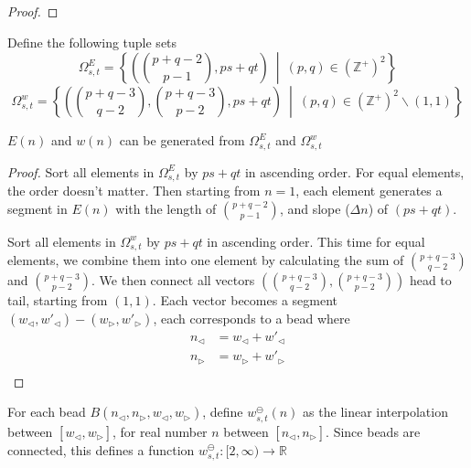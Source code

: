 \documentclass[]{article}
\begin{document}
\begin{proof}
\end{proof}

\vspace{1cm}
\begin{definition}[Pascal]
	Define the following tuple sets
	\[
	\Omega^E_{s,t} = \left\{\left(\binom{p+q-2}{p-1}, ps+qt \right) \ \middle|\ (p,q)\in(\mathbb{Z}^+)^2 \right\}
	\]
	\[
	\Omega^w_{s,t} = \left\{\left(\binom{p+q-3}{q-2}, \binom{p+q-3}{p-2}, ps+qt \right) \ \middle|\ (p,q)\in(\mathbb{Z}^+)^2 \backslash (1,1) \right\}
	\]
\end{definition}

\vspace{1cm}
\begin{lemma}[Pascal]
	$E(n)$ and $w(n)$ can be generated from $\Omega^E_{s,t}$ and $\Omega^w_{s,t}$
\end{lemma}
\begin{proof}

Sort all elements in $\Omega^E_{s,t}$ by $ps+qt$ in ascending order. For equal elements, the order doesn't matter. Then starting from $n=1$, each element generates a segment in $E(n)$ with the length of $\binom{p+q-2}{p-1}$, and slope ($\Delta n$) of $(ps+qt)$.


Sort all elements in $\Omega^w_{s,t}$ by $ps+qt$ in ascending order. This time for equal elements, we combine them into one element by calculating the sum of $\binom{p+q-3}{q-2}$ and $\binom{p+q-3}{p-2}$. We then connect all vectors $\left(\binom{p+q-3}{q-2}, \binom{p+q-3}{p-2}\right)$ head to tail, starting from $(1,1)$. Each vector becomes a segment $(w_{\triangleleft}, w'_{\triangleleft}) - (w_{\triangleright}, w'_{\triangleright})$, each corresponds to a bead where
\begin{align*}
	n_\triangleleft &= w_{\triangleleft} + w'_{\triangleleft} \\
	n_\triangleright &= w_{\triangleright} + w'_{\triangleright} \\
\end{align*}

\end{proof}

\vspace{1cm}
\begin{definition}[Middle]
	For each bead $	B(n_{\triangleleft}, n_{\triangleright}, w_{\triangleleft}, w_{\triangleright})$, define $w^{\ominus}_{s,t}(n)$ as the linear interpolation between $[w_{\triangleleft}, w_{\triangleright}]$, for real number $n$ between $[n_{\triangleleft}, n_{\triangleright}]$. Since beads are connected, this defines a function $w_{s,t}^{\ominus}: [2, \infty)\to\mathbb{R}$
\end{definition}
\end{document}
